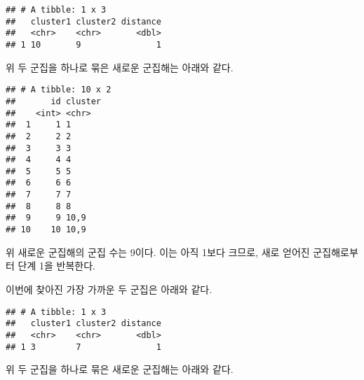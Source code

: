 \documentclass[]{book}
\newenvironment{Shaded}{\begin{snugshade}}{\end{snugshade}}
\newcommand{\DecValTok}[1]{\textcolor[rgb]{0.00,0.00,0.81}{#1}}
\newcommand{\KeywordTok}[1]{\textcolor[rgb]{0.13,0.29,0.53}{\textbf{#1}}}
\newcommand{\NormalTok}[1]{#1}
\newcommand{\OperatorTok}[1]{\textcolor[rgb]{0.81,0.36,0.00}{\textbf{#1}}}
\newcommand{\StringTok}[1]{\textcolor[rgb]{0.31,0.60,0.02}{#1}}
\begin{document}
\begin{verbatim}
## # A tibble: 1 x 3
##   cluster1 cluster2 distance
##   <chr>    <chr>       <dbl>
## 1 10       9               1
\end{verbatim}

위 두 군집을 하나로 묶은 새로운 군집해는 아래와 같다.

\begin{Shaded}
\end{Shaded}

\begin{verbatim}
## # A tibble: 10 x 2
##       id cluster
##    <int> <chr>  
##  1     1 1      
##  2     2 2      
##  3     3 3      
##  4     4 4      
##  5     5 5      
##  6     6 6      
##  7     7 7      
##  8     8 8      
##  9     9 10,9   
## 10    10 10,9
\end{verbatim}

위 새로운 군집해의 군집 수는 9이다. 이는 아직 1보다 크므로, 새로 얻어진 군집해로부터 단계 1을 반복한다.

\begin{Shaded}
\end{Shaded}

이번에 찾아진 가장 가까운 두 군집은 아래와 같다.

\begin{Shaded}
\end{Shaded}

\begin{verbatim}
## # A tibble: 1 x 3
##   cluster1 cluster2 distance
##   <chr>    <chr>       <dbl>
## 1 3        7               1
\end{verbatim}

위 두 군집을 하나로 묶은 새로운 군집해는 아래와 같다.
\end{document}

